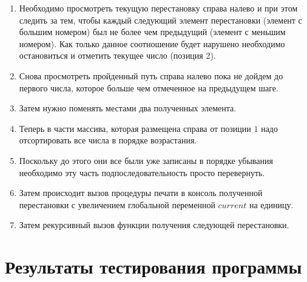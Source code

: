 \documentclass[bachelor, och, labwork]{shiza}
\begin{document}
\begin{enumerate}
    
\item Необходимо просмотреть текущую перестановку справа налево и при этом 
следить за тем, чтобы каждый следующий элемент перестановки (элемент с большим 
номером) был не более чем предыдущий (элемент с меньшим номером). Как только данное 
соотношение будет нарушено необходимо остановиться и отметить текущее число 
(позиция 2).

\item Снова просмотреть пройденный путь справа налево пока не дойдем до первого 
числа, которое больше чем отмеченное на предыдущем шаге. 

\item Затем нужно поменять местами два полученных элемента.

\item Теперь в части массива, которая размещена справа от позиции $1$ надо 
отсортировать все числа в порядке возрастания. 

\item Поскольку до этого они все были уже записаны в порядке убывания 
необходимо эту часть подпоследовательность просто перевернуть.

\item Затем происходит вызов процедуры печати в консоль полученной перестановки с
увеличением глобальной переменной $current$ на единицу.

\item Затем рекурсивный вызов функции получения следующей перестановки.

\end{enumerate}

\section{Результаты тестирования программы}
\end{document}
